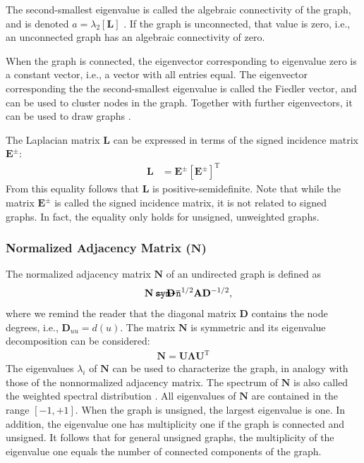 \documentclass{article}
\def\mathnote#1{%
  \tag*{\rlap{\hspace\marginparsep\smash{\parbox[t]{\marginparwidth}{#1}}}}
}
\begin{document}
The second-smallest eigenvalue is called the algebraic connectivity of
the graph, and is denoted $a = \lambda_2[\mathbf L]$ \citep{b652}.  If the graph is
unconnected, that value is zero, i.e., an unconnected graph has an
algebraic connectivity of zero. 

When the graph is connected, the eigenvector corresponding to eigenvalue
zero is a constant vector, i.e., a vector with all entries equal. The
eigenvector corresponding the the second-smallest eigenvalue is called
the Fiedler vector, and can be used to cluster nodes in the
graph. Together with further eigenvectors, it can be used to draw
graphs \citep{kunegis:signed-kernels}. 

The Laplacian matrix $\mathbf L$ can be expressed in terms of the signed
incidence matrix $\mathbf E^{\pm}$:
\begin{align*}
  \mathbf L &= \mathbf E^{\pm} [\mathbf E^{\pm}]^{\mathrm T}
\end{align*}
From this equality follows that $\mathbf L$ is positive-semidefinite.   
Note that while the matrix $\mathbf E^{\pm}$ is called the signed
incidence matrix, it is not related to signed graphs.  In fact, the
equality only holds for unsigned, unweighted graphs. 

\subsubsection{Normalized Adjacency Matrix ($\mathbf N$)}
The normalized adjacency matrix $\mathbf N$ of an undirected graph is
defined as 
\begin{align*}
  \mathnote{\texttt{sym-n}}
  \mathbf N &= \mathbf D^{-1/2} \mathbf A \mathbf D^{-1/2},
\end{align*}
where we remind the reader that the diagonal matrix $\mathbf D$
contains the node degrees, i.e., $\mathbf D_{uu} = d(u)$. 
The matrix $\mathbf N$ is symmetric and its eigenvalue decomposition can
be considered:
\begin{align}
  \mathbf N = \mathbf U \mathbf \Lambda \mathbf U^{\mathrm T}
\end{align}
The eigenvalues $\lambda_i$ of $\mathbf N$ can be used to characterize
the graph, in analogy with those of the nonnormalized adjacency
matrix.
The spectrum of $\mathbf N$ is also called the weighted spectral
distribution \citep{b864}.
All eigenvalues of $\mathbf N$ are contained in the range
$[-1,+1]$.  When the graph is unsigned, the largest eigenvalue is one.
In addition, the eigenvalue one has multiplicity one if the graph is
connected and unsigned.  It follows that for general unsigned graphs,
the multiplicity of the eigenvalue one equals the number of connected
components of the graph. 
\end{document}
